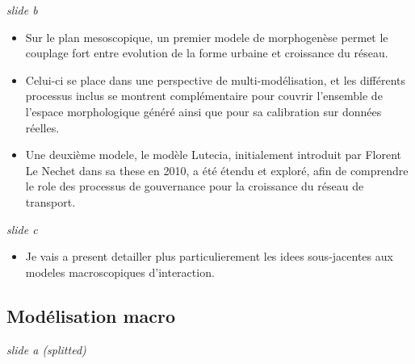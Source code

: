\documentclass[12pt]{article}
\begin{document}
\textit{slide b}

\begin{itemize}
	\item Sur le plan mesoscopique, un premier modele de morphogenèse permet le couplage fort entre evolution de la forme urbaine et croissance du réseau.
	\item Celui-ci se place dans une perspective de multi-modélisation, et les différents processus inclus se montrent complémentaire pour couvrir l'ensemble de l'espace morphologique généré ainsi que pour sa calibration sur données réelles.
	\item Une deuxième modele, le modèle Lutecia, initialement introduit par Florent Le Nechet dans sa these en 2010, a été étendu et exploré, afin de comprendre le role des processus de gouvernance pour la croissance du réseau de transport.
\end{itemize}

\textit{slide c}

\begin{itemize}
	\item Je vais a present detailler plus particulierement les idees sous-jacentes aux modeles macroscopiques d'interaction.
\end{itemize}


\newpage



\subsection*{Modélisation macro}



\textit{slide a (splitted)}
\end{document}
